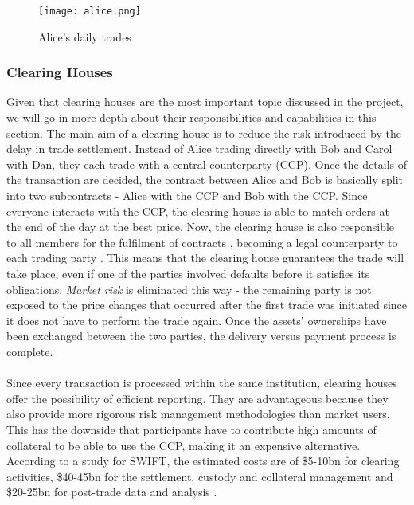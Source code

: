 \documentclass[12pt,twoside]{article}
\begin{document}
\begin{figure}[H]
\centering
\texttt{[image: alice.png]}
\centering
\caption{Alice's daily trades}
\label{fig:alice}
\end{figure}

\subsubsection{Clearing Houses}
\label{sub:CH}
Given that clearing houses are the most important topic discussed in the project, we will go in more depth about their responsibilities and capabilities in this section. The main aim of a clearing house is to reduce the risk introduced by the delay in trade settlement. Instead of Alice trading directly with Bob and Carol with Dan, they each trade with a central counterparty (CCP). Once the details of the transaction are decided, the contract between Alice and Bob is basically split into two subcontracts - Alice with the CCP and Bob with the CCP. Since everyone interacts with the CCP, the clearing house is able to match orders at the end of the day at the best price. Now, the clearing house is also responsible to all members for the fulfilment of contracts \cite{clearinghouse}, becoming a legal counterparty to each trading party \cite{whatclearing} \cite{whatclearing2}. This means that the clearing house guarantees the trade will take place, even if one of the parties involved defaults before it satisfies its obligations. \textit{Market risk} is eliminated this way - the remaining party is not exposed to the price changes that occurred after the first trade was initiated since it does not have to perform the trade again. Once the assets' ownerships have been exchanged between the two parties, the delivery versus payment process is complete.
\\ \\
Since every transaction is processed within the same institution, clearing houses offer the possibility of efficient reporting. They are advantageous because they also provide more rigorous risk management methodologies than market users. This has the downside that participants have to contribute high amounts of collateral to be able to use the CCP, making it an expensive alternative. According to a study for SWIFT, the estimated costs are of \$5-10bn for clearing activities, \$40-45bn for the settlement, custody and collateral management and \$20-25bn for post-trade data and analysis \cite{DLTclearing}. 
\end{document}
